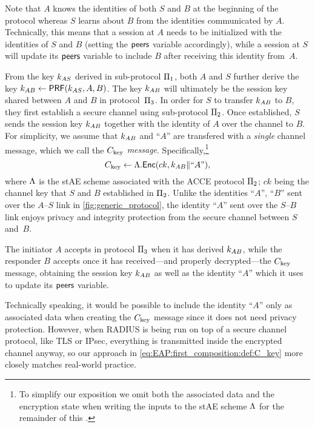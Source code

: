 Note that $A$ knows the identities of both $S$ and $B$ at the beginning of the protocol
whereas $S$ learns about $B$ from the identities communicated by $A$.
Technically,
this means that a session at $A$ needs to be initialized with the identities of $S$ and $B$
(setting the $\mathsf{peers}$ variable accordingly),
while a session at $S$ will update its $\mathsf{peers}$ variable to include $B$ after receiving this identity from~$A$. 

From the key $k_{AS}$ derived in sub-protocol $\mathrm{\Pi}_1$,
both $A$ and $S$ further derive the key $k_{AB} \gets \mathsf{PRF}(k_{AS},A,B)$.
The key $k_{AB}$ will ultimately be the session key shared between $A$ and $B$ in protocol~$\mathrm{\Pi}_3$.
In order for $S$ to transfer $k_{AB}$ to $B$,
 they first establish a secure channel using sub-protocol $\mathrm{\Pi}_2$.
Once established,
$S$ sends the session key $k_{AB}$ together with the identity of $A$ over the channel to $B$.
For simplicity,
we assume that $k_{AB}$ and ``$A$'' are transfered with a \emph{single} channel message,
which we call the \emph{$C_{\mathrm{key}}$ message}.
Specifically,\footnote{To 
simplify our exposition we omit both the associated data and the encryption state when writing the inputs to the stAE scheme $\Lambda$ for the remainder of this .  
}
\begin{equation}\label{eq:EAP:first_composition:def:C_key}
	C_{\mathrm{key}} \gets \Lambda.\mathsf{Enc}(ck, k_{AB} \| ``A") ,
\end{equation}
where $\Lambda$ is the stAE scheme associated with the ACCE protocol $\mathrm{\Pi}_2$;
$ck$ being the channel key that $S$ and $B$ established in $\mathrm{\Pi}_2$.
Unlike the identities ``$A$'', ``$B$'' sent over the $A$--$S$ link in \cref{fig:generic_protocol},
the identity ``$A$'' sent over the $S$--$B$ link enjoys privacy and integrity protection from the secure channel between $S$ and~$B$.

The initiator $A$ accepts in protocol $\mathrm{\Pi}_3$ when it has derived $k_{AB}$,
while the responder $B$ accepts once it has received---and properly decrypted---the $C_{\mathrm{key}}$ message,
obtaining the session key $k_{AB}$ as well as the identity ``$A$'' which it uses to update its $\mathsf{peers}$ variable.

\begin{remark}
Technically speaking,
it would be possible to include the identity ``$A$'' only as associated data when creating the $C_{\mathrm{key}}$ message
since it does not need privacy protection.
However,
when RADIUS is being run on top of a secure channel protocol,
like TLS or IPsec,
everything is transmitted inside the encrypted channel anyway,
so our approach in \cref{eq:EAP:first_composition:def:C_key} more closely matches real-world practice.
\end{remark}

